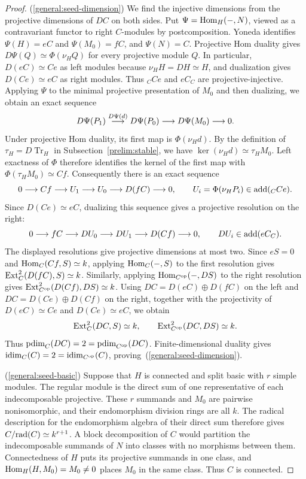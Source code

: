 \documentclass[11pt]{article}
\begin{document}
\begin{proof}
\textup{(\ref{general:seed-dimension})} We find the injective dimensions from the projective
dimensions of $DC$ on both sides. Put $\Psi={\rm Hom}_H(-,N)$, viewed as a contravariant functor to
right $C$-modules by postcomposition. Yoneda identifies $\Psi(H)=eC$ and
$\Psi(M_0)=fC$, and $\Psi(N)=C$. Projective Hom duality
gives $D\Psi(Q)\simeq\Phi(\nu_HQ)$ for every projective module $Q$.
In particular, $D(eC)\simeq Ce$ as left modules because
$\nu_HH=DH\simeq H$, and dualization gives $D(Ce)\simeq eC$ as
right modules.  Thus ${_C}Ce$ and $eC_C$ are projective-injective.
Applying $\Psi$ to the minimal projective presentation of $M_0$ and then dualizing,
we obtain an exact sequence
\[
 D\Psi(P_1)\stackrel{D\Psi(d)}{\longrightarrow}D\Psi(P_0)
 \longrightarrow D\Psi(M_0)\longrightarrow0.
\]
Under projective Hom duality, its first map is $\Phi(\nu_Hd)$.
By the definition of $\tau_H=D\operatorname{Tr}_H$ in
Subsection~\ref{prelim:stable}, we have
$\ker(\nu_Hd)\simeq\tau_HM_0$.  Left exactness of $\Phi$ therefore
identifies the kernel of the first map with $\Phi(\tau_HM_0)\simeq Cf$.
Consequently there is an exact sequence
\begin{equation*}
 0\longrightarrow Cf\longrightarrow U_1\longrightarrow U_0
 \longrightarrow D(fC)\longrightarrow0,
 \qquad U_i=\Phi(\nu_HP_i)\in{\rm add}(_CCe).
\end{equation*}
Since $D(Ce)\simeq eC$, dualizing this sequence gives a projective
resolution on the right:
\begin{equation*}
 0\longrightarrow fC\longrightarrow DU_0\longrightarrow DU_1
 \longrightarrow D(Cf)\longrightarrow0,
 \qquad DU_i\in{\rm add}(eC_C).
\end{equation*}
The displayed resolutions give projective dimensions at most two.
Since $eS=0$ and ${\rm Hom}_C(Cf,S)\simeq k$, applying ${\rm Hom}_C(-,S)$
to the first resolution gives ${\rm Ext}_C^2(D(fC),S)\simeq k$.
Similarly, applying ${\rm Hom}_{C^{\mathrm{op}}}(-,DS)$ to the right
resolution gives ${\rm Ext}_{C^{\mathrm{op}}}^2(D(Cf),DS)\simeq k$.
Using $DC=D(eC)\oplus D(fC)$ on the left and
$DC=D(Ce)\oplus D(Cf)$ on the right, together with the projectivity
of $D(eC)\simeq Ce$ and $D(Ce)\simeq eC$, we obtain
\[
 {\rm Ext}_C^2(DC,S)\simeq k,\qquad
 {\rm Ext}_{C^{\mathrm{op}}}^2(DC,DS)\simeq k.
\]
Thus ${\rm pdim}_C(DC)=2={\rm pdim}_{C^{\mathrm{op}}}(DC)$.
Finite-dimensional duality gives
${\rm idim}_C(C)=2={\rm idim}_{C^{\mathrm{op}}}(C)$,
proving~\textup{(\ref{general:seed-dimension})}.

\textup{(\ref{general:seed-basic})} Suppose that $H$ is connected and split basic with
$r$ simple modules.  The regular module is the direct sum of one
representative of each indecomposable projective.  These $r$ summands and $M_0$ are
pairwise nonisomorphic, and their endomorphism division rings are
all $k$.  The radical description for the endomorphism algebra of
their direct sum therefore gives
$C/{\rm rad}(C)\simeq k^{r+1}$.
A block decomposition of $C$ would partition the indecomposable
summands of $N$ into classes with no morphisms between them.
Connectedness of $H$ puts its projective summands in one class, and
${\rm Hom}_H(H,M_0)=M_0\ne0$ places $M_0$ in the same class. Thus $C$
is connected.
\end{proof}
\end{document}

